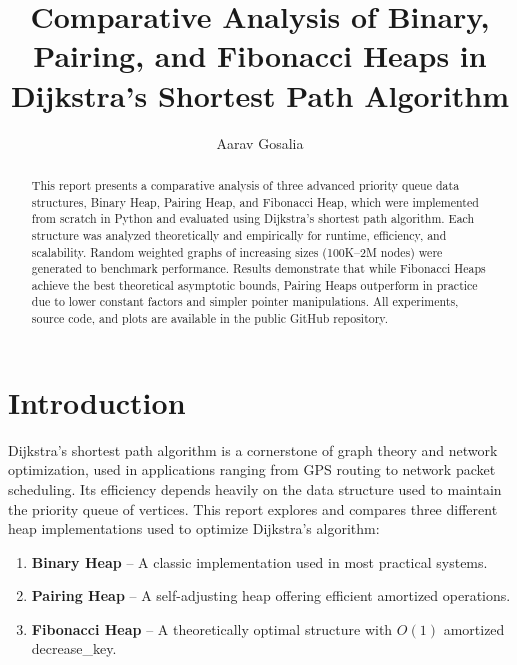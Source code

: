 \documentclass[acmsmall]{acmart}
\begin{document}
\title{Comparative Analysis of Binary, Pairing, and Fibonacci Heaps in Dijkstra’s Shortest Path Algorithm}

\author{Aarav Gosalia}

\begin{abstract}
This report presents a comparative analysis of three advanced priority queue data structures, Binary Heap, Pairing Heap, and Fibonacci Heap, which were implemented from scratch in Python and evaluated using Dijkstra’s shortest path algorithm. Each structure was analyzed theoretically and empirically for runtime, efficiency, and scalability. Random weighted graphs of increasing sizes (100K–2M nodes) were generated to benchmark performance. Results demonstrate that while Fibonacci Heaps achieve the best theoretical asymptotic bounds, Pairing Heaps outperform in practice due to lower constant factors and simpler pointer manipulations. All experiments, source code, and plots are available in the public GitHub repository.
\end{abstract}


\maketitle

\section{Introduction}
Dijkstra’s shortest path algorithm is a cornerstone of graph theory and network optimization, used in applications ranging from GPS routing to network packet scheduling. Its efficiency depends heavily on the data structure used to maintain the priority queue of vertices. This report explores and compares three different heap implementations used to optimize Dijkstra’s algorithm:
\begin{enumerate}
  \item \textbf{Binary Heap} – A classic implementation used in most practical systems.
  \item \textbf{Pairing Heap} – A self-adjusting heap offering efficient amortized operations.
  \item \textbf{Fibonacci Heap} – A theoretically optimal structure with $O(1)$ amortized decrease\_key.
\end{enumerate}
\end{document}
